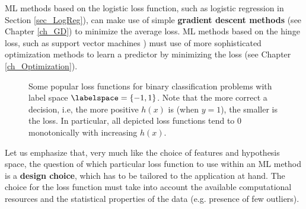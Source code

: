 \documentclass[12pt]{report}
\begin{document}
ML methods based on the logistic loss function, such as 
logistic regression in Section \ref{sec_LogReg}), can make 
use of simple {\bf gradient descent methods} (see 
Chapter \ref{ch_GD}) to minimize the average loss. 
ML methods based on the hinge loss, such as support 
vector machines \cite{hastie01statisticallearning}) must 
use of more sophisticated optimization methods to learn 
a predictor by minimizing the loss (see Chapter \ref{ch_Optimization}).  

\begin{figure}[htbp]
\begin{center}
     \vspace*{-10mm}
\end{center}
\caption{Some popular loss functions for binary classification problems with 
	label space $\labelspace=\{-1,1\}$. Note that the more correct a decision, i.e, 
	the more positive $h(x)$ is (when $y=1$), the smaller is the loss. In particular, 
    all depicted loss functions tend to $0$ monotonically with increasing $h(x)$.}
\label{fig_class_loss}
\end{figure}

Let us emphasize that, very much like the choice of features 
and hypothesis space, the question of which particular loss 
function to use within an ML method is a {\bf design choice}, 
which has to be tailored to the application at hand. The choice 
for the loss function must take into account the available 
computational resources and the statistical properties of the 
data (e.g. presence of few outliers). 
\end{document}

